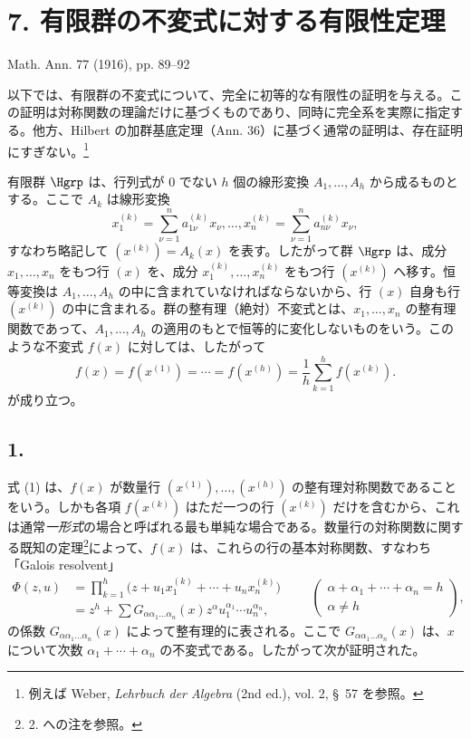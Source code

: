 \section*{7. 有限群の不変式に対する有限性定理}
\begin{center}
Math. Ann. 77 (1916), pp. 89--92
\end{center}

以下では、有限群の不変式について、完全に初等的な有限性の証明を与える。この証明は対称関数の理論だけに基づくものであり、同時に完全系を実際に指定する。他方、Hilbert の加群基底定理（Ann. 36）に基づく通常の証明は、存在証明にすぎない。\footnote{例えば Weber, \emph{Lehrbuch der Algebra} (2nd ed.), vol. 2, \S\ 57 を参照。}

有限群 $\Hgrp$ は、行列式が 0 でない $h$ 個の線形変換 $A_1,\ldots,A_h$ から成るものとする。ここで $A_k$ は線形変換
\[
  x_1^{(k)}=\sum_{\nu=1}^{n}a_{1\nu}^{(k)}x_\nu,\ldots,
  x_n^{(k)}=\sum_{\nu=1}^{n}a_{n\nu}^{(k)}x_\nu,
\]
すなわち略記して $(x^{(k)})=A_k(x)$ を表す。したがって群 $\Hgrp$ は、成分 $x_1,
\ldots,x_n$ をもつ行 $(x)$ を、成分 $x_1^{(k)},
\ldots,x_n^{(k)}$ をもつ行 $(x^{(k)})$ へ移す。恒等変換は $A_1,
\ldots,A_h$ の中に含まれていなければならないから、行 $(x)$ 自身も行 $(x^{(k)})$ の中に含まれる。群の整有理（絶対）不変式とは、$x_1,
\ldots,x_n$ の整有理関数であって、$A_1,
\ldots,A_h$ の適用のもとで恒等的に変化しないものをいう。このような不変式 $f(x)$ に対しては、したがって
\begin{equation}
  f(x)=f(x^{(1)})=\cdots=f(x^{(h)})=
  \frac1h\sum_{k=1}^{h}f(x^{(k)}).
\tag{1}
\end{equation}
が成り立つ。

\subsection*{1.}
式 (1) は、$f(x)$ が数量行 $(x^{(1)}),
\ldots,(x^{(h)})$ の整有理対称関数であることをいう。しかも各項 $f(x^{(k)})$ はただ一つの行 $(x^{(k)})$ だけを含むから、これは通常\emph{一形式}の場合と呼ばれる最も単純な場合である。数量行の対称関数に関する既知の定理\footnote{2. への注を参照。}によって、$f(x)$ は、これらの行の基本対称関数、すなわち「Galois resolvent」
\[
\begin{aligned}
  \Phi(z,u)
  &=\prod_{k=1}^{h}\bigl(z+u_1x_1^{(k)}+\cdots+u_nx_n^{(k)}\bigr) \\
  &=z^h+
    \sum G_{\alpha\alpha_1\ldots\alpha_n}(x)
    z^{\alpha}u_1^{\alpha_1}\cdots u_n^{\alpha_n},
\end{aligned}
\qquad
\left(\begin{array}{c}
\alpha+\alpha_1+
\cdots+
\alpha_n=h\\
\alpha\ne h
\end{array}\right),
\]
の係数 $G_{\alpha\alpha_1\ldots\alpha_n}(x)$ によって整有理的に表される。ここで $G_{\alpha\alpha_1\ldots\alpha_n}(x)$ は、$x$ について次数 $\alpha_1+\cdots+\alpha_n$ の不変式である。したがって次が証明された。

